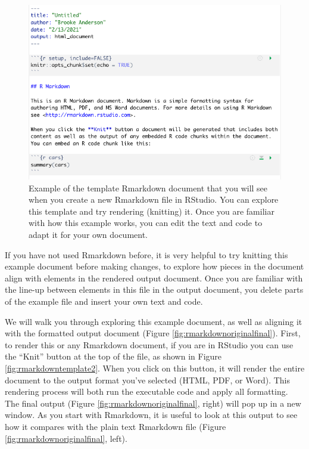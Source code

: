 \documentclass[]{tufte-book}
\begin{document}
\begin{figure}
\includegraphics[width=\textwidth]{figures/rmarkdown_template} \caption[Example of the template Rmarkdown document that you will see when you create a new Rmarkdown file in RStudio]{Example of the template Rmarkdown document that you will see when you create a new Rmarkdown file in RStudio. You can explore this template and try rendering (knitting) it. Once you are familiar with how this example works, you can edit the text and code to adapt it for your own document.}\label{fig:rmarkdowntemplate}
\end{figure}

If you have not used Rmarkdown before, it is very helpful to try knitting this
example document before making changes, to explore how pieces in the document
align with elements in the rendered output document. Once you are
familiar with the line-up between elements in this file in the output document,
you delete parts of the example file and insert your own text and code.

We will walk you through exploring this example document, as well as aligning it
with the formatted output document (Figure \ref{fig:rmarkdownoriginalfinal}).
First, to render this or any Rmarkdown document, if you are in RStudio you can
use the ``Knit'' button at the top of the file, as shown in Figure
\ref{fig:rmarkdowntemplate2}. When you click on this button, it will render the
entire document to the output format you've selected (HTML, PDF, or Word). This
rendering process will both run the executable code and apply all formatting.
The final output (Figure \ref{fig:rmarkdownoriginalfinal}, right) will pop up
in a new window. As you start with Rmarkdown, it is useful to look at this
output to see how it compares with the plain text Rmarkdown file (Figure
\ref{fig:rmarkdownoriginalfinal}, left).
\end{document}

